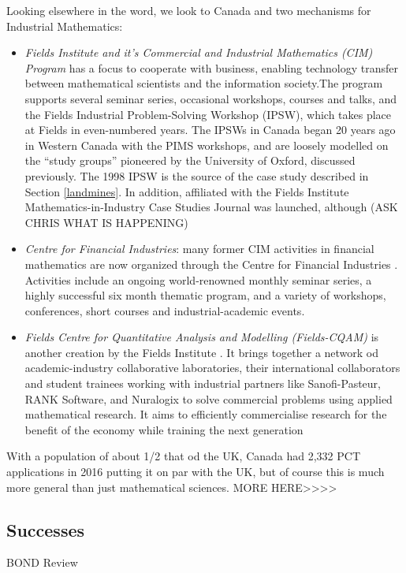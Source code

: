 \documentclass[11pt]{article} %
\begin{document}
	Looking elsewhere in the word, we look to Canada and two mechanisms for Industrial Mathematics: 
	

	\begin{itemize}
		\item \textit{Fields Institute and it's Commercial and Industrial Mathematics (CIM) Program} \cite{FieldsCIM}  has a focus to cooperate with business, enabling technology transfer between mathematical scientists and the information society.The program supports several seminar series, occasional workshops, courses and talks, and the Fields Industrial Problem-Solving Workshop (IPSW), which takes place at Fields in even-numbered years. The IPSWs in Canada began 20 years ago in Western Canada with the PIMS workshops, and are loosely modelled on the “study groups” pioneered by the University of Oxford, discussed previously. The 1998 IPSW is the source of the case study described in Section \ref{landmines}.
		 In addition, affiliated with  the Fields Institute Mathematics-in-Industry Case Studies Journal was launched, although (ASK CHRIS WHAT IS HAPPENING) 
		\item \textit{Centre for Financial Industries}: many former CIM activities in financial mathematics are now organized through the Centre for Financial Industries \cite{FieldsCFI}. Activities include an ongoing world-renowned monthly seminar series, a highly successful six month thematic program, and a variety of workshops, conferences, short courses and industrial-academic events. 
		\item \textit{Fields Centre for Quantitative Analysis and Modelling (Fields-CQAM)} is another creation by the Fields Institute \cite{CQAM}. It brings together a network od academic-industry collaborative laboratories, their international collaborators and  student trainees working   with industrial partners like Sanofi-Pasteur, RANK Software, and Nuralogix to solve commercial problems using applied mathematical research. It aims to efficiently commercialise research for the benefit of the economy while training the next generation 
	\end{itemize}
	

	
With a population of about 1/2 that od the UK, Canada had 2,332 PCT applications in 2016 \cite{WIPO} putting it on par with the UK, but of course this is much more general than just mathematical sciences. MORE HERE>>>>
	\subsection{Successes}
	BOND Review 
	
\end{document}
